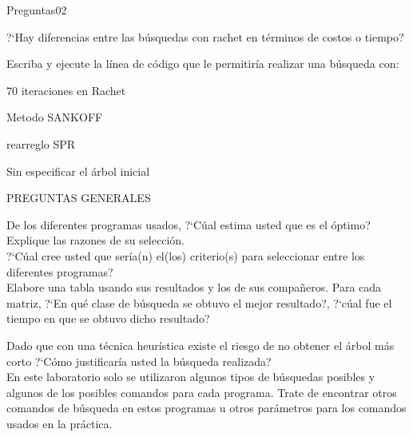 \begin{itemize}
\begin{enumerate}
{Preguntas02}

?`Hay diferencias entre las b\'usquedas con rachet en t\'erminos de costos o tiempo?

Escriba y ejecute la l\'inea de c\'odigo que le permitir\'ia realizar una b\'usqueda con:
 
70 iteraciones en Rachet 

Metodo SANKOFF

rearreglo SPR

Sin especificar el \'arbol inicial

\end{enumerate}


{PREGUNTAS GENERALES}

De los diferentes programas usados,  ?`C\'ual estima usted que es el \'optimo? Explique las razones de su selecci\'on.\\
?`C\'ual cree usted que ser\'ia(n) el(los) criterio(s) para seleccionar entre los diferentes programas?\\ 

Elabore una tabla usando sus resultados y los de sus compa\~neros.  Para cada matriz,  ?`En qu\'e clase de b\'usqueda se obtuvo el mejor resultado?,  ?`c\'ual fue el tiempo en que se obtuvo dicho resultado?

Dado que con una t\'ecnica heur\'istica existe el riesgo de no obtener el \'arbol m\'as corto ?`C\'omo justificar\'ia usted la b\'usqueda realizada?\\

En este laboratorio solo se utilizaron algunos tipos de b\'usquedas posibles y algunos de los posibles comandos para cada programa. Trate de encontrar otros comandos de b\'usqueda en estos programas u otros par\'ametros para los comandos usados en la pr\'actica.

\end{itemize}


